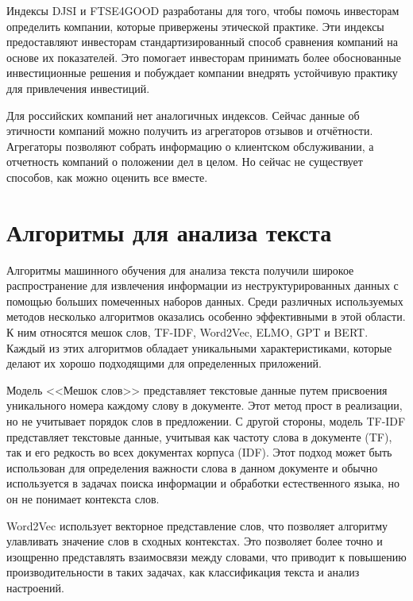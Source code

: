 \documentclass[PI, VKR]{HSEUniversity}
\begin{document}
Индексы DJSI и FTSE4GOOD разработаны для того, чтобы помочь инвесторам определить компании, которые привержены этической практике. Эти индексы предоставляют инвесторам стандартизированный способ сравнения компаний на основе их показателей. Это помогает инвесторам принимать более обоснованные инвестиционные решения и побуждает компании внедрять устойчивую практику для привлечения инвестиций.

Для российских компаний нет аналогичных индексов. Сейчас данные об этичности компаний можно получить из агрегаторов отзывов и отчётности. Агрегаторы позволяют собрать информацию о клиентском обслуживании, а отчетность компаний о положении дел в целом. Но сейчас не существует способов, как можно оценить все вместе.
\section{Алгоритмы для анализа текста}
\label{sec:org38f65f0}
Алгоритмы машинного обучения для анализа текста получили широкое распространение для извлечения информации из неструктурированных данных с помощью больших помеченных наборов данных. Среди различных используемых методов несколько алгоритмов оказались особенно эффективными в этой области. К ним относятся мешок слов\autocite{harris_distributional_1954}, TF-IDF\autocite{jones_karen_sparck_statistical_1972}, Word2Vec\autocite{mikolov_distributed_2013}, ELMO\autocite{peters_deep_2018}, GPT\autocite{radford_language_2019} и BERT\autocite{devlin_bert_2019}. Каждый из этих алгоритмов обладает уникальными характеристиками, которые делают их хорошо подходящими для определенных приложений.

Модель {}<<Мешок слов>>{} представляет текстовые данные путем присвоения уникального номера каждому слову в документе. Этот метод прост в реализации, но не учитывает порядок слов в предложении. С другой стороны, модель TF-IDF представляет текстовые данные, учитывая как частоту слова в документе (TF), так и его редкость во всех документах корпуса (IDF). Этот подход может быть использован для определения важности слова в данном документе и обычно используется в задачах поиска информации и обработки естественного языка, но он не понимает контекста слов.

Word2Vec использует векторное представление слов, что позволяет алгоритму улавливать значение слов в сходных контекстах. Это позволяет более точно и изощренно представлять взаимосвязи между словами, что приводит к повышению производительности в таких задачах, как классификация текста и анализ настроений.
\end{document}
